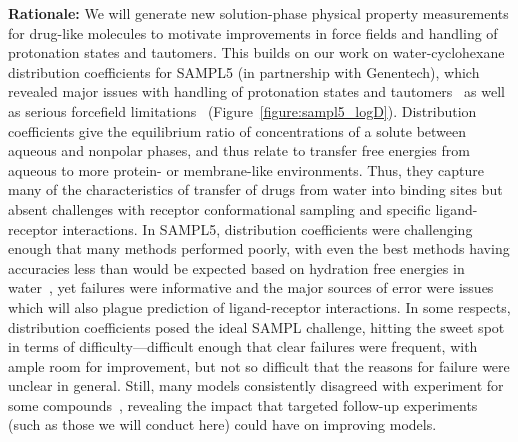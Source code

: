 \documentclass[11pt]{article}
\begin{document}
{\bf Rationale:}
We will generate new solution-phase physical property measurements for drug-like molecules to motivate improvements in force fields and handling of protonation states and tautomers.
This builds on our work on water-cyclohexane distribution coefficients for SAMPL5 (in partnership with Genentech), which revealed major issues with handling of protonation states and tautomers~\cite{bannan_blind_2016}  as well as serious forcefield limitations~\cite{paranahewage_predicting_2016} (Figure~\ref{figure:sampl5_logD}).
Distribution coefficients give the equilibrium ratio of concentrations of a solute between aqueous and nonpolar phases, and thus relate to transfer free energies from aqueous to more protein- or membrane-like environments.
Thus, they capture many of the characteristics of transfer of drugs from water into binding sites but absent challenges with receptor conformational sampling and specific ligand-receptor interactions.
In SAMPL5, distribution coefficients were challenging enough that many methods performed poorly, with even the best methods having accuracies less than would be expected based on hydration free energies in water~\cite{bannan_blind_2016}, yet failures were informative and the major sources of error were issues which will also plague prediction of ligand-receptor interactions.
In some respects, distribution coefficients posed the ideal SAMPL challenge, hitting the sweet spot in terms of difficulty---difficult enough that clear failures were frequent, with ample room for improvement, but not so difficult that the reasons for failure were unclear in general. 
Still, many models consistently disagreed with experiment for some compounds~\cite{paranahewage_predicting_2016, klamt_prediction_2016, bannan_blind_2016, rustenburg_measuring_2016}, revealing the impact that targeted follow-up experiments (such as those we will conduct here) could have on improving models.
\end{document}
